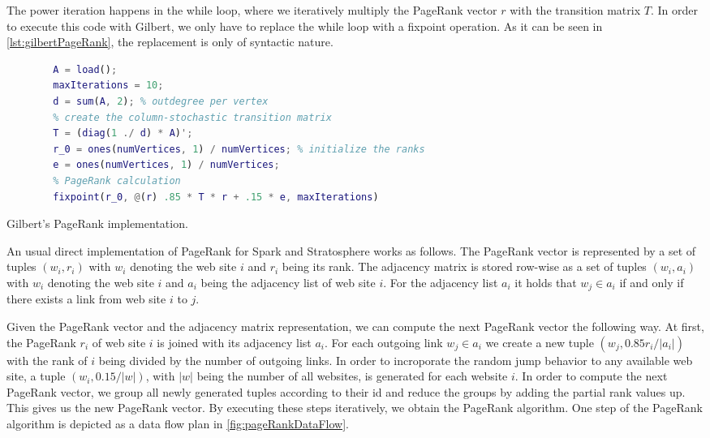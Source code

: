 The power iteration happens in the while loop, where we iteratively multiply the PageRank vector $r$ with the transition matrix $T$.
In order to execute this code with Gilbert, we only have to replace the while loop with a fixpoint operation.
As it can be seen in \cref{lst:gilbertPageRank}, the replacement is only of syntactic nature.

\begin{listing}[!h]
	\begin{CenteredBox}
		\begin{lstlisting}[language=Matlab]
		% load adjacency matrix
		A = load();
		maxIterations = 10;
		d = sum(A, 2); % outdegree per vertex
		% create the column-stochastic transition matrix
		T = (diag(1 ./ d) * A)'; 
		r_0 = ones(numVertices, 1) / numVertices; % initialize the ranks
		e = ones(numVertices, 1) / numVertices;
		% PageRank calculation
		fixpoint(r_0, @(r) .85 * T * r + .15 * e, maxIterations)
		\end{lstlisting}
	\end{CenteredBox}
	\caption{Gilbert's PageRank implementation.}
	\label{lst:gilbertPageRank}
\end{listing}

An usual direct implementation of PageRank for Spark and Stratosphere works as follows.
The PageRank vector is represented by a set of tuples $(w_i, r_i)$ with $w_i$ denoting the web site $i$ and $r_i$ being its rank.
The adjacency matrix is stored row-wise as a set of tuples $(w_i, a_i)$ with $w_i$ denoting the web site $i$ and $a_i$ being the adjacency list of web site $i$.
For the adjacency list $a_i$ it holds that $w_j \in a_i$ if and only if there exists a link from web site $i$ to $j$.

Given the PageRank vector and the adjacency matrix representation, we can compute the next PageRank vector the following way.
At first, the PageRank $r_i$ of web site $i$ is joined with its adjacency list $a_i$.
For each outgoing link $w_j \in a_i$ we create a new tuple $(w_j, 0.85r_i/\left|a_i\right|)$ with the rank of $i$ being divided by the number of outgoing links.
In order to incroporate the random jump behavior to any available web site, a tuple $(w_i, 0.15/|w|)$, with $|w|$ being the number of all websites, is generated for each website $i$.
In order to compute the next PageRank vector, we group all newly generated tuples according to their id and reduce the groups by adding the partial rank values up.
This gives us the new PageRank vector.
By executing these steps iteratively, we obtain the PageRank algorithm.
One step of the PageRank algorithm is depicted as a data flow plan in \cref{fig:pageRankDataFlow}.

